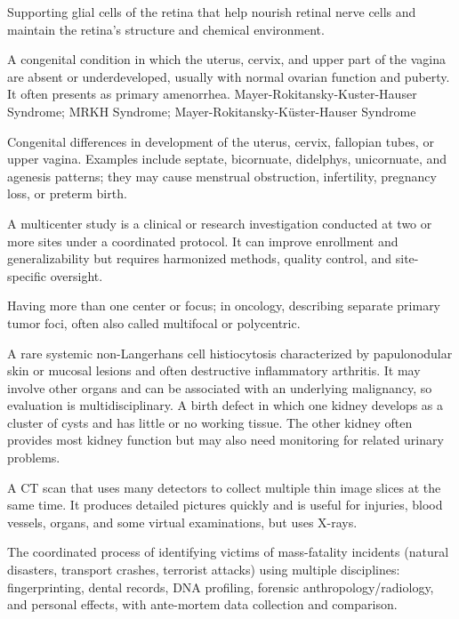 Supporting glial cells of the retina that help nourish retinal nerve cells and maintain the retina's structure and chemical environment.

 A congenital condition in which the uterus, cervix, and upper part of the vagina are absent or underdeveloped, usually with normal ovarian function and puberty. It often presents as primary amenorrhea.
\synonyms
Mayer-Rokitansky-Kuster-Hauser Syndrome; MRKH Syndrome; Mayer-Rokitansky-Küster-Hauser Syndrome

 Congenital differences in development of the uterus, cervix, fallopian tubes, or upper vagina. Examples include septate, bicornuate, didelphys, unicornuate, and agenesis patterns; they may cause menstrual obstruction, infertility, pregnancy loss, or preterm birth.

 A multicenter study is a clinical or research investigation conducted at two or more sites under a coordinated protocol. It can improve enrollment and generalizability but requires harmonized methods, quality control, and site-specific oversight.

 Having more than one center or focus; in oncology, describing separate primary tumor foci, often also called multifocal or polycentric.

 A rare systemic non-Langerhans cell histiocytosis characterized by papulonodular skin or mucosal lesions and often destructive inflammatory arthritis. It may involve other organs and can be associated with an underlying malignancy, so evaluation is multidisciplinary.
 A birth defect in which one kidney develops as a cluster of cysts and has little or no working tissue. The other kidney often provides most kidney function but may also need monitoring for related urinary problems.

 A CT scan that uses many detectors to collect multiple thin image slices at the same time. It produces detailed pictures quickly and is useful for injuries, blood vessels, organs, and some virtual examinations, but uses X-rays.

 The coordinated process of identifying victims of mass-fatality incidents (natural
disasters, transport crashes, terrorist attacks) using multiple disciplines:
fingerprinting, dental records, DNA profiling, forensic anthropology/radiology, and
personal effects, with ante-mortem data collection and comparison.

